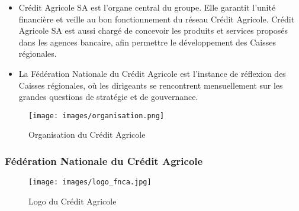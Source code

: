 \documentclass[12pt,a4paper]{article}
\begin{document}
\begin{itemize}
\item Crédit Agricole SA est l'organe central du groupe. Elle garantit l'unité financière et veille au bon fonctionnement du réseau Crédit Agricole. Crédit Agricole SA est aussi chargé de concevoir les produits et services proposés dans les agences bancaire, afin permettre le développement des Caisses régionales.
\item La Fédération Nationale du Crédit Agricole est l'instance de réflexion des Caisses régionales, où les dirigeants se rencontrent mensuellement sur les grandes questions de stratégie et de gouvernance.
\end{itemize}
\par

\begin{figure}[h!]
\centering
\texttt{[image: images/organisation.png]}
\caption{Organisation du Crédit Agricole}
\end{figure}

\newpage
\subsubsection{Fédération Nationale du Crédit Agricole}

\begin{figure}[h!]
\centering
\texttt{[image: images/logo\_fnca.jpg]}
\caption{\label{logo}Logo du Crédit Agricole} %
\end{figure}
\end{document}
